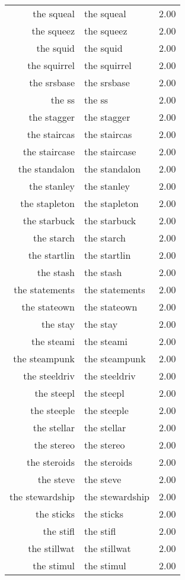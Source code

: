 \begin{table}[ht]
\begin{tabular}{rlr}
  the squeal & the squeal & 2.00 \\ 
  the squeez & the squeez & 2.00 \\ 
  the squid & the squid & 2.00 \\ 
  the squirrel & the squirrel & 2.00 \\ 
  the srsbase & the srsbase & 2.00 \\ 
  the ss & the ss & 2.00 \\ 
  the stagger & the stagger & 2.00 \\ 
  the staircas & the staircas & 2.00 \\ 
  the staircase & the staircase & 2.00 \\ 
  the standalon & the standalon & 2.00 \\ 
  the stanley & the stanley & 2.00 \\ 
  the stapleton & the stapleton & 2.00 \\ 
  the starbuck & the starbuck & 2.00 \\ 
  the starch & the starch & 2.00 \\ 
  the startlin & the startlin & 2.00 \\ 
  the stash & the stash & 2.00 \\ 
  the statements & the statements & 2.00 \\ 
  the stateown & the stateown & 2.00 \\ 
  the stay & the stay & 2.00 \\ 
  the steami & the steami & 2.00 \\ 
  the steampunk & the steampunk & 2.00 \\ 
  the steeldriv & the steeldriv & 2.00 \\ 
  the steepl & the steepl & 2.00 \\ 
  the steeple & the steeple & 2.00 \\ 
  the stellar & the stellar & 2.00 \\ 
  the stereo & the stereo & 2.00 \\ 
  the steroids & the steroids & 2.00 \\ 
  the steve & the steve & 2.00 \\ 
  the stewardship & the stewardship & 2.00 \\ 
  the sticks & the sticks & 2.00 \\ 
  the stifl & the stifl & 2.00 \\ 
  the stillwat & the stillwat & 2.00 \\ 
  the stimul & the stimul & 2.00 \\ 

\end{tabular}
\end{table}
